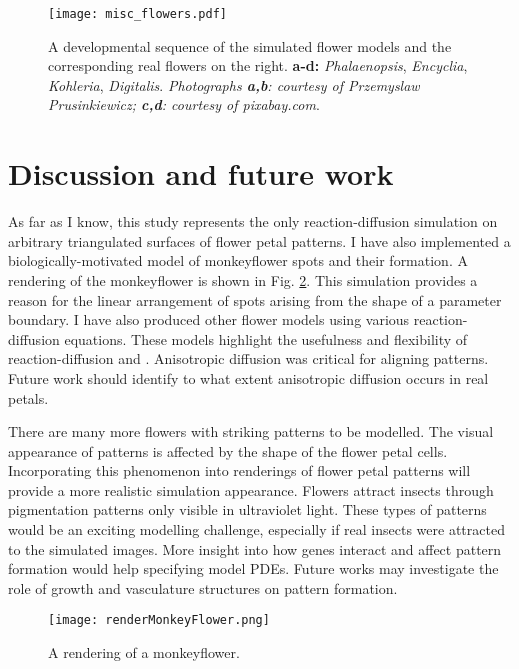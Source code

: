 \begin{figure}[ht]
	\centering
	\texttt{[image: misc\_flowers.pdf]}
	\caption[A developmental sequence of the simulated flower models and the corresponding real flowers]{A developmental sequence of the simulated flower models and the corresponding real flowers on the right. \textbf{a-d:} \textit{Phalaenopsis}, \textit{Encyclia}, \textit{Kohleria}, \textit{Digitalis}. \textit{Photographs \textbf{a,b}: courtesy of Przemyslaw Prusinkiewicz; \textbf{c,d}: courtesy of pixabay.com}.}
	\label{fig:miscFlowers}
\end{figure}

\section{Discussion and future work}
As far as I know, this study represents the only reaction-diffusion simulation on arbitrary triangulated surfaces of flower petal patterns. I have also implemented a biologically-motivated model of monkeyflower spots and their formation. A rendering of the monkeyflower is shown in Fig. \ref{fig:monkeyFlowerRendering}. This simulation provides a reason for the linear arrangement of spots arising from the shape of a parameter boundary. I have also produced other flower models using various reaction-diffusion equations. These models highlight the usefulness and flexibility of reaction-diffusion and \ProgramName{}. Anisotropic diffusion was critical for aligning patterns. Future work should identify to what extent anisotropic diffusion occurs in real petals.

There are many more flowers with striking patterns to be modelled. The visual appearance of patterns is affected by the shape of the flower petal cells. Incorporating this phenomenon into renderings of flower petal patterns will provide a more realistic simulation appearance. Flowers attract insects through pigmentation patterns only visible in ultraviolet light. These types of patterns would be an exciting modelling challenge, especially if real insects were attracted to the simulated images. More insight into how genes interact and affect pattern formation would help specifying model PDEs. Future works may investigate the role of growth and vasculature structures on pattern formation. 

\begin{figure}[ht]
	\centering
	\texttt{[image: renderMonkeyFlower.png]}
	\caption[A rendering of a monkeyflower]{A rendering of a monkeyflower.}
	\label{fig:monkeyFlowerRendering}
\end{figure}

